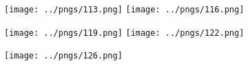 \documentclass[12pt, a4paper]{article}
\begin{document}
\begin{figure}
\centering
\texttt{[image: ../pngs/113.png]}
\texttt{[image: ../pngs/116.png]}
\end{figure}

\begin{figure}
\centering
\texttt{[image: ../pngs/119.png]}
\texttt{[image: ../pngs/122.png]}
\end{figure}

\begin{figure}
\centering
\texttt{[image: ../pngs/126.png]}
\end{figure}



\end{document}
